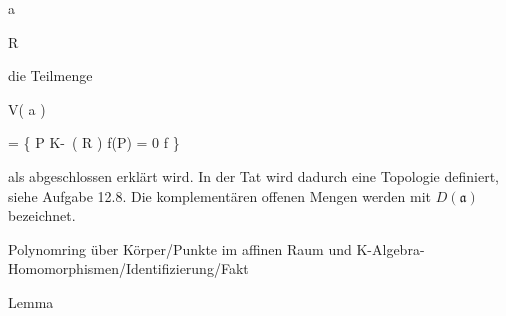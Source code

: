 \mavergleichskette

{\vergleichskette

{ {\mathfrak a}
}

{ \subseteq }{ R
}

{  }{
}

{    }{
}

{   }{
}

}
{}{}{}
 {} {}
die Teilmenge


\mavergleichskettedisp

{\vergleichskette

{ V( {\mathfrak a} )
}

{ =} { \left\{  P \in K\!-\!\, \left(  R  \right)   \mid  f(P) = 0   f          \right\}
}

{ } {
}

{ } {
}

{ } {
}

}
{}{}{}
als abgeschlossen erklärt wird. In der Tat wird dadurch eine Topologie definiert, siehe
Aufgabe 12.8.
Die komplementären offenen Mengen werden mit $D( {\mathfrak a} )$ bezeichnet.



{Polynomring über Körper/Punkte im affinen Raum und K-Algebra-Homomorphismen/Identifizierung/Fakt}

{Lemma}

{}

